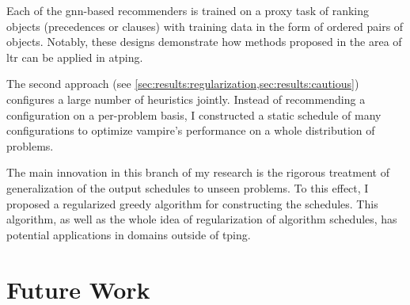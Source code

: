 Each of the \acrshort{gnn}-based recommenders is trained on a proxy task of ranking objects (precedences or clauses)
with training data in the form of ordered pairs of objects.
Notably, these designs demonstrate how methods proposed in the area of \acrlong{ltr}
can be applied in \gls{atping}.

The second approach (see \cref{sec:results:regularization,sec:results:cautious}) configures a large number of heuristics jointly.
Instead of recommending a configuration on a per-problem basis,
I constructed a static schedule of many configurations to optimize \gls{vampire}'s performance on a whole distribution of problems.

The main innovation in this branch of my research is the rigorous treatment of generalization of the output schedules to unseen problems.
To this effect, I proposed a regularized greedy algorithm for constructing the schedules.
This algorithm, as well as the whole idea of regularization of algorithm schedules, has potential applications in domains outside of \gls{tping}.


\section{Future Work}

